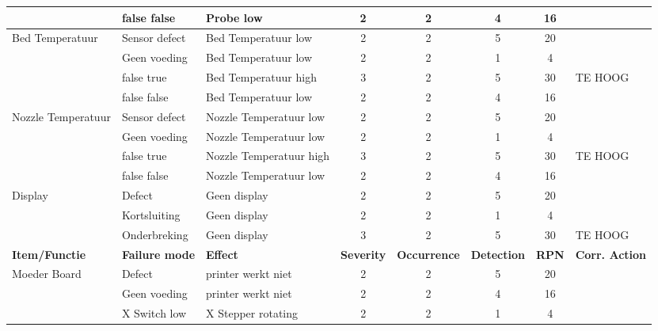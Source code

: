 \documentclass{article}
\begin{document}
\begin{landscape}
\begin{longtable}{|l|l|l|c|c|c|c|l|}
                                            & false false       & Probe low  & 2 & 2 & 4 & 16 & \\ 
                                            \hline
        \multirow{4}{*}{Bed Temperatuur}    & Sensor defect     & Bed Temperatuur low  & 2 & 2 & 5 & 20 & \\
                                            & Geen voeding      & Bed Temperatuur low  & 2 & 2 & 1 &  4 & \\
                                            & false true        & Bed Temperatuur high & 3 & 2 & 5 & 30 & TE HOOG \\
                                            & false false       & Bed Temperatuur low  & 2 & 2 & 4 & 16 & \\ 
                                            \hline
        \multirow{4}{*}{Nozzle Temperatuur} & Sensor defect     & Nozzle Temperatuur low  & 2 & 2 & 5 & 20 & \\
                                            & Geen voeding      & Nozzle Temperatuur low  & 2 & 2 & 1 &  4 & \\
                                            & false true        & Nozzle Temperatuur high & 3 & 2 & 5 & 30 & TE HOOG \\
                                            & false false       & Nozzle Temperatuur low  & 2 & 2 & 4 & 16 & \\ 
                                            \hline          
        \multirow{3}{*}{Display}            & Defect            & Geen display  & 2 & 2 & 5 & 20 & \\ 
                                            & Kortsluiting      & Geen display  & 2 & 2 & 1 &  4 & \\
                                            & Onderbreking      & Geen display  & 3 & 2 & 5 & 30 & TE HOOG \\
                                            \hline 
        \newpage
        \hline
        \textbf{Item/Functie} & \textbf{Failure mode} & \textbf{Effect} & \textbf{Severity} & \textbf{Occurrence} & \textbf{Detection} & \textbf{RPN} & \textbf{Corr. Action} \\ \hline
        \multirow{15}{*}{Moeder Board}      & Defect                    & printer werkt niet        & 2 & 2 & 5 & 20 & \\
                                            & Geen voeding              & printer werkt niet        & 2 & 2 & 4 & 16 & \\
                                            & X Switch low              & X Stepper rotating        & 2 & 2 & 1 &  4 & \\

\end{longtable}
\end{landscape}
\end{document}

